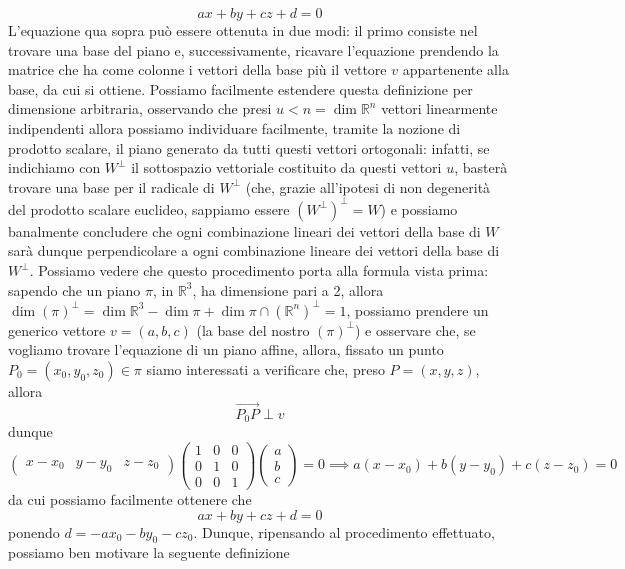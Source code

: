 \documentclass[openany, italian]{book}
\begin{document}
\begin{equation}
ax + by + cz + d = 0
\end{equation}
L'equazione qua sopra può essere ottenuta in due modi: il primo consiste nel trovare una base del piano e, successivamente, ricavare l'equazione prendendo la matrice che ha come colonne i vettori della base più il vettore $v$ appartenente alla base, da cui si ottiene. Possiamo facilmente estendere questa definizione per dimensione arbitraria, osservando che presi $u < n = \dim{\mathbb{R}^n}$ vettori linearmente indipendenti allora possiamo individuare facilmente, tramite la nozione di prodotto scalare, il piano generato da tutti questi vettori ortogonali: infatti, se indichiamo con $W^{\perp}$ il sottospazio vettoriale costituito da questi vettori $u$, basterà trovare una base per il radicale di $W^{\perp}$ (che, grazie all'ipotesi di non degenerità del prodotto scalare euclideo, sappiamo essere $(W^{\perp})^{\perp} = W$) e possiamo banalmente concludere che ogni combinazione lineari dei vettori della base di $W$ sarà dunque perpendicolare a ogni combinazione lineare dei vettori della base di $W^{\perp}$. Possiamo vedere che questo procedimento porta alla formula vista prima: sapendo che un piano $\pi$, in $\mathbb{R}^3$, ha dimensione pari a 2, allora $\dim{(\pi)^{\perp}} = \dim{\mathbb{R}^3} - \dim{\pi} + \dim{\pi \cap (\mathbb{R}^n)^{\perp}} = 1$, possiamo prendere un generico vettore $v = (a, b, c)$ (la base del nostro $(\pi)^{\perp}$) e osservare che, se vogliamo trovare l'equazione di un piano affine, allora, fissato un punto $P_0 = (x_0, y_0, z_0) \in \pi$ siamo interessati a verificare che, preso $P = (x, y, z)$, allora
$$
\vec{P_0P} \perp v
$$
dunque
$$
\begin{pmatrix}
	x - x_0 & y-y_0 & z-z_0
\end{pmatrix} \begin{pmatrix}
1 & 0 & 0 \\
0 & 1 & 0 \\
0 & 0 & 1
\end{pmatrix} \begin{pmatrix}
a \\
b \\
c
\end{pmatrix} = 0 \implies
a(x-x_0) + b(y-y_0) + c(z-z_0) = 0
$$
da cui possiamo facilmente ottenere che
$$
ax+by +cz + d  = 0
$$
ponendo $d = - ax_0 - by_0 - cz_0$. Dunque, ripensando al procedimento effettuato, possiamo ben motivare la seguente definizione
\end{document}
